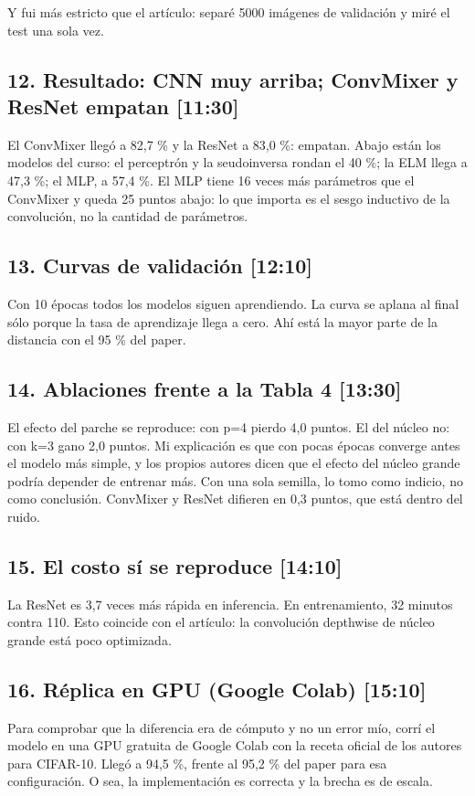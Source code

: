 \documentclass[11pt,a4paper]{article}
\begin{document}
Y fui más estricto que el artículo: separé 5000 imágenes de validación y miré el test una sola vez.

\subsection{12. Resultado: CNN muy arriba; ConvMixer y ResNet empatan \hfill \normalfont\small [11:30]}
El ConvMixer llegó a 82,7 \% y la ResNet a 83,0 \%: empatan. Abajo están los modelos del curso: el perceptrón y la seudoinversa rondan el 40 \%; la ELM llega a 47,3 \%; el MLP, a 57,4 \%. El MLP tiene 16 veces más parámetros que el ConvMixer y queda 25 puntos abajo: lo que importa es el sesgo inductivo de la convolución, no la cantidad de parámetros.

\subsection{13. Curvas de validación \hfill \normalfont\small [12:10]}
Con 10 épocas todos los modelos siguen aprendiendo. La curva se aplana al final sólo porque la tasa de aprendizaje llega a cero. Ahí está la mayor parte de la distancia con el 95 \% del paper.

\subsection{14. Ablaciones frente a la Tabla 4 \hfill \normalfont\small [13:30]}
El efecto del parche se reproduce: con p=4 pierdo 4,0 puntos. El del núcleo no: con k=3 gano 2,0 puntos. Mi explicación es que con pocas épocas converge antes el modelo más simple, y los propios autores dicen que el efecto del núcleo grande podría depender de entrenar más. Con una sola semilla, lo tomo como indicio, no como conclusión. ConvMixer y ResNet difieren en 0,3 puntos, que está dentro del ruido.

\subsection{15. El costo sí se reproduce \hfill \normalfont\small [14:10]}
La ResNet es 3,7 veces más rápida en inferencia. En entrenamiento, 32 minutos contra 110. Esto coincide con el artículo: la convolución depthwise de núcleo grande está poco optimizada.

\subsection{16. Réplica en GPU (Google Colab) \hfill \normalfont\small [15:10]}
Para comprobar que la diferencia era de cómputo y no un error mío, corrí el modelo en una GPU gratuita de Google Colab con la receta oficial de los autores para CIFAR-10. Llegó a 94,5 \%, frente al 95,2 \% del paper para esa configuración. O sea, la implementación es correcta y la brecha es de escala.
\end{document}
